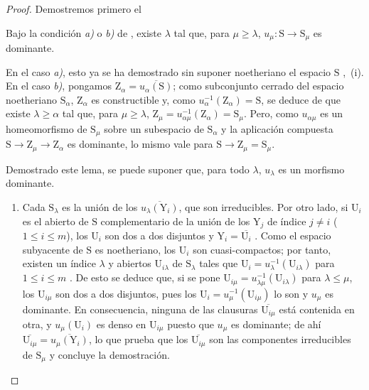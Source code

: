 \begin{proof}
Demostremos primero el

\begin{lemma}[8.4.2.1]
\label{IV.8.4.2.1}
Bajo la condición \emph{a)} o \emph{b)} de , existe $\lambda$ tal que, para $\mu\geqslant\lambda$, $u_\mu:\mathrm{S}\to\mathrm{S}_\mu$ es dominante.
\end{lemma}

En el caso \emph{a)}, esto ya se ha demostrado sin suponer noetheriano el espacio $\mathrm{S}$ ,~(i).
En el caso \emph{b)}, pongamos $\mathrm{Z}_\alpha=\overline{u_\alpha(\mathrm{S})}$; como subconjunto cerrado del espacio noetheriano $\mathrm{S}_\alpha$, $\mathrm{Z}_\alpha$ es constructible y, como $u_\alpha^{-1}(\mathrm{Z}_\alpha)=\mathrm{S}$, se deduce de  que existe $\lambda\geqslant\alpha$ tal que, para $\mu\geqslant\lambda$, $\mathrm{Z}_\mu=u_{\alpha\mu}^{-1}(\mathrm{Z}_\alpha)=\mathrm{S}_\mu$.
Pero, como $u_{\alpha\mu}$ es un homeomorfismo de $\mathrm{S}_\mu$ sobre un subespacio de $\mathrm{S}_\alpha$ y la aplicación compuesta $\mathrm{S}\to\mathrm{Z}_\mu\to\mathrm{Z}_\alpha$ es dominante, lo mismo vale para $\mathrm{S}\to\mathrm{Z}_\mu=\mathrm{S}_\mu$.

Demostrado este lema, se puede suponer que, para todo $\lambda$, $u_\lambda$ es un morfismo dominante.
\begin{enumerate}[label=(\roman*)]
  \item Cada $\mathrm{S}_\lambda$ es la unión de los $\overline{u_\lambda(\mathrm{Y}_i)}$, que son irreducibles.
Por otro lado, si $\mathrm{U}_i$ es el abierto de $\mathrm{S}$ complementario de la unión de los $\mathrm{Y}_j$ de índice $j\neq i$ ($1\leqslant i\leqslant m$), los $\mathrm{U}_i$ son dos a dos disjuntos y $\mathrm{Y}_i=\overline{\mathrm{U}_i}$ .
Como el espacio subyacente de $\mathrm{S}$ es noetheriano, los $\mathrm{U}_i$ son cuasi-compactos; por tanto, existen un índice $\lambda$ y abiertos $\mathrm{U}_{i\lambda}$ de $\mathrm{S}_\lambda$ tales que $\mathrm{U}_i=u_\lambda^{-1}(\mathrm{U}_{i\lambda})$ para $1\leqslant i\leqslant m$ .
De esto se deduce que, si se pone $\mathrm{U}_{i\mu}=u_{\lambda\mu}^{-1}(\mathrm{U}_{i\lambda})$ para $\lambda\leqslant\mu$, los $\mathrm{U}_{i\mu}$ son dos a dos disjuntos, pues los $\mathrm{U}_i=u_\mu^{-1}(\mathrm{U}_{i\mu})$ lo son y $u_\mu$ es dominante.
En consecuencia, ninguna de las clausuras $\overline{\mathrm{U}_{i\mu}}$ está contenida en otra, y $u_\mu(\mathrm{U}_i)$ es denso en $\mathrm{U}_{i\mu}$ puesto que $u_\mu$ es dominante; de ahí $\overline{\mathrm{U}_{i\mu}}=\overline{u_\mu(\mathrm{Y}_i)}$, lo que prueba que los $\overline{\mathrm{U}_{i\mu}}$ son las componentes irreducibles de $\mathrm{S}_\mu$  y concluye la demostración.


\end{enumerate}
\end{proof}
